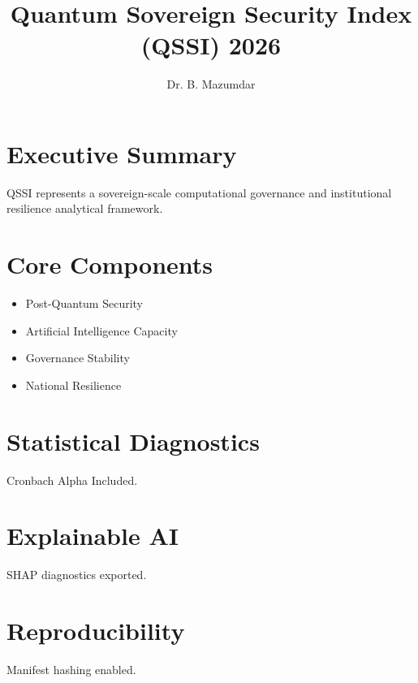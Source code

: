 \documentclass[11pt]{article}
\begin{document}
\title{Quantum Sovereign Security Index (QSSI) 2026}

\author{
Dr. B. Mazumdar
}

\maketitle

\section{Executive Summary}

QSSI represents a sovereign-scale computational governance
and institutional resilience analytical framework.

\section{Core Components}

\begin{itemize}

\item Post-Quantum Security
\item Artificial Intelligence Capacity
\item Governance Stability
\item National Resilience

\end{itemize}

\section{Statistical Diagnostics}

Cronbach Alpha Included.

\section{Explainable AI}

SHAP diagnostics exported.

\section{Reproducibility}

Manifest hashing enabled.
\end{document}

